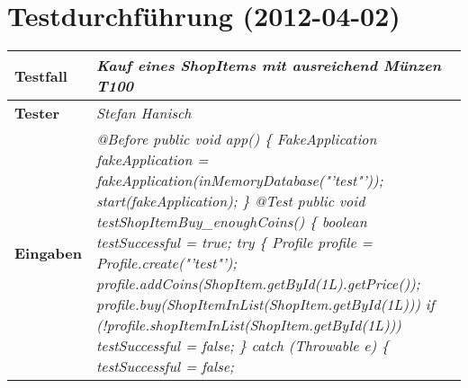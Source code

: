 
\chapter{Testdurchführung (2012-04-02)}



\begin{longtable}{|p{4cm}|p{11cm}|}
\hline
\textbf{Testfall} & \textit{Kauf eines ShopItems mit ausreichend Münzen \textbf{T100}} \\
\hline
\textbf{Tester} & \textit{Stefan Hanisch} \\
\hline
\textbf{Eingaben} & \textit{@Before \newline
public void app() \{ \newline
\hspace*{1mm}FakeApplication fakeApplication \newline
\hspace*{4mm}= fakeApplication(inMemoryDatabase("'test"'));\newline
\hspace*{1mm}start(fakeApplication); \newline
\} \newline
\newline
@Test \newline
public void testShopItemBuy\_enoughCoins() \{\newline
\hspace*{1mm}boolean testSuccessful = true; \newline
\hspace*{1mm}try \{\newline
\hspace*{3mm}Profile profile = Profile.create("'test"');\newline
\hspace*{3mm}profile.addCoins(ShopItem.getById(1L).getPrice());\newline
\hspace*{3mm}profile.buy(ShopItemInList(ShopItem.getById(1L)))\newline
\hspace*{3mm}if (!profile.shopItemInList(ShopItem.getById(1L)))\newline
\hspace*{5mm}testSuccessful = false; \newline
\hspace*{1mm}\} catch (Throwable e) \{ \newline
\hspace*{3mm}testSuccessful = false; \newline 
}
\end{longtable}
